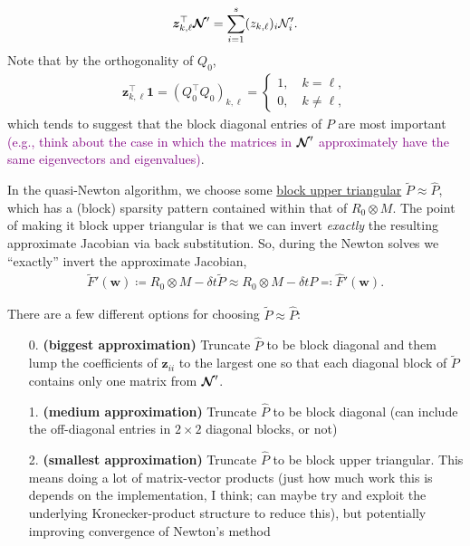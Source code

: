 \documentclass[review]{siamart}
\newcommand{\tcp}{\textcolor{purple}}
\begin{document}
\begin{align}
\bm{z}^\top_{k,\ell} \bm{{\cal N}}' = \sum \limits_{i = 1}^s (z_{k, \ell})_i {\cal N}'_i.
\end{align}
Note that by the orthogonality of $Q_0$,
\begin{align}
\bm{z}^\top_{k,\ell} \bm{1} 
= 
(Q_0^\top Q_0)_{k, \ell}
=
\begin{cases}
1, \quad k = \ell,\\
0, \quad k \neq \ell,
\end{cases}
\end{align}
which tends to suggest that the block diagonal entries of $P$ are most important \tcp{(e.g., think about the case in which the matrices in $\bm{{\cal N}}'$ approximately have the same eigenvectors and eigenvalues)}. 

In the quasi-Newton algorithm, we choose some \underline{block upper triangular} $\widetilde{P} \approx \widehat{P}$, which has a (block) sparsity pattern contained within that of $R_0 \otimes M$. The point of making it block upper triangular is that we can invert \textit{exactly} the resulting approximate Jacobian via back substitution. So, during the Newton solves we ``exactly'' invert the approximate Jacobian, 
\begin{align}
\widetilde{F}'(\bm{w}) 
\coloneqq  
R_0 \otimes M - 
\delta t \tilde{P}
\approx
R_0 \otimes M - 
\delta t P
\eqqcolon
\widehat{F}'(\bm{w}).
\end{align}

There are a few different options for choosing $\widetilde{P} \approx \widehat{P}$:
\begin{enumerate}
\setlength\itemsep{0.5em}

\item[0.] \textbf{(biggest approximation)} Truncate $\widehat{P}$ to be block diagonal and them lump the coefficients of $\bm{z}_{ii}$ to the largest one so that each diagonal block of $\widetilde{P}$ contains only one matrix from $\bm{{\cal N}}'$.

\item[1.] \textbf{(medium approximation)} Truncate $\widehat{P}$ to be block diagonal (can include the off-diagonal entries in $2 \times 2$ diagonal blocks, or not)

\item[2.] \textbf{(smallest approximation)} Truncate $\widehat{P}$ to be block upper triangular. This means doing a lot of matrix-vector products (just how much work this is depends on the implementation, I think; can maybe try and exploit the underlying Kronecker-product structure to reduce this), but potentially improving convergence of Newton's method

\end{enumerate}
\end{document}
